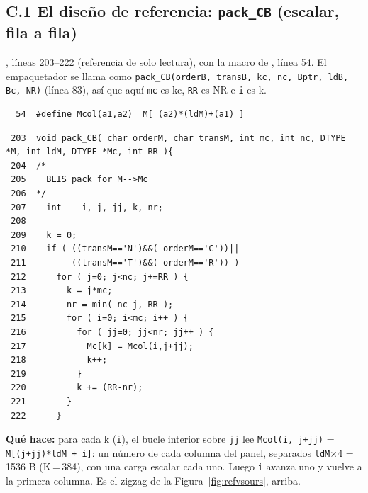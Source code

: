 \documentclass[10pt,a4paper]{article}
\begin{document}
\subsection*{C.1 El diseño de referencia: \texttt{pack\_CB} (escalar, fila a fila)}
, líneas 203--222 (referencia de solo lectura), con la macro de
, línea 54. El empaquetador se llama como \texttt{pack\_CB(orderB, transB, kc, nc, Bptr, ldB, Bc, NR)} (línea 83),
así que aquí \texttt{mc} es kc, \texttt{RR} es NR e \texttt{i} es k.
{\footnotesize\begin{verbatim}
  54  #define Mcol(a1,a2)  M[ (a2)*(ldM)+(a1) ]
\end{verbatim}}
{\footnotesize\begin{verbatim}
 203  void pack_CB( char orderM, char transM, int mc, int nc, DTYPE *M, int ldM, DTYPE *Mc, int RR ){
 204  /*
 205    BLIS pack for M-->Mc
 206  */
 207    int    i, j, jj, k, nr;
 208  
 209    k = 0;
 210    if ( ((transM=='N')&&( orderM=='C'))||
 211         ((transM=='T')&&( orderM=='R')) )
 212      for ( j=0; j<nc; j+=RR ) { 
 213        k = j*mc;
 214        nr = min( nc-j, RR );
 215        for ( i=0; i<mc; i++ ) {
 216          for ( jj=0; jj<nr; jj++ ) {
 217            Mc[k] = Mcol(i,j+jj);
 218            k++;
 219          }
 220          k += (RR-nr);
 221        }
 222      }
\end{verbatim}}

\textbf{Qué hace:} para cada k (\texttt{i}), el bucle interior sobre \texttt{jj} lee \texttt{Mcol(i, j+jj)} =
\texttt{M[(j+jj)*ldM + i]}: un número de cada columna del panel, separados \texttt{ldM}$\times$4 = 1536 B (K\,=\,384), con una carga
escalar cada uno. Luego \texttt{i} avanza uno y vuelve a la primera columna. Es el zigzag de la Figura~\ref{fig:refvsours}, arriba.
\end{document}
